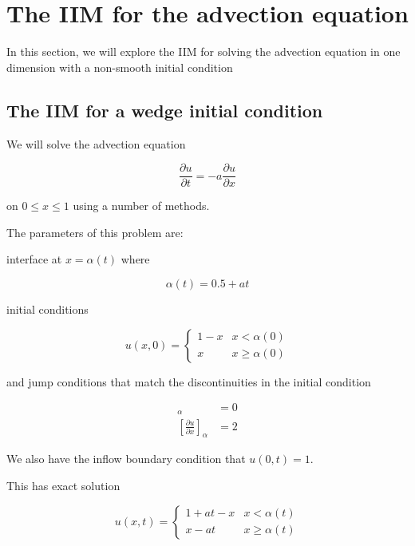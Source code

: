 \section{The IIM for the advection equation}
In this section, we will explore the IIM for solving the advection equation in one dimension with a non-smooth initial condition

\subsection{The IIM for a wedge initial condition}

We will solve the advection equation

\begin{equation}
    \frac{\partial u}{\partial t} = -a \frac{\partial u}{\partial x}
\end{equation}

on $0 \leq x \leq 1$ using a number of methods.

The parameters of this problem are:

interface at $x = \alpha(t)$ where

\begin{equation}
    \alpha(t) = 0.5 + a t
\end{equation}

initial conditions

\begin{equation}
    u(x,0) = \begin{cases}
        1 - x & x < \alpha(0) \\
        x & x \geq \alpha(0)
    \end{cases}
\end{equation}

and jump conditions that match the discontinuities in the initial condition

\begin{align*}
    [u]_\alpha & = 0 \\
    \left[\frac{\partial u}{\partial x}\right]_\alpha & = 2
\end{align*}

We also have the inflow boundary condition that $u(0,t) = 1$.

This has exact solution 

\begin{equation}
    u(x,t) = \begin{cases}
        1 + at - x & x < \alpha(t) \\
        x - at & x \geq \alpha(t)
    \end{cases}
\end{equation}

